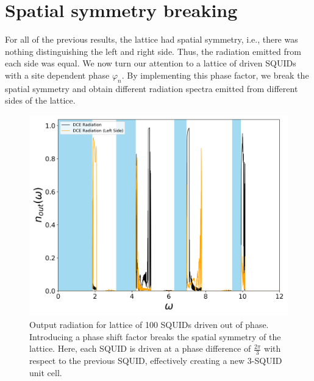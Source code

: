 \section{Spatial symmetry breaking}\label{sec:results_symmetry_breaking}

For all of the previous results, the lattice had spatial symmetry, i.e., there was nothing distinguishing the left and right side. Thus, the radiation emitted from each side was equal. We now turn our attention to a lattice of driven SQUIDs with a site dependent phase $\varphi_n$. By implementing this phase factor, we break the spatial symmetry and obtain different radiation spectra emitted from different sides of the lattice.
%
\begin{figure}[h]
    \includegraphics[width=\textwidth, keepaspectratio]{figures/results/phase_shift_2pi_3_both.png}
    \caption{Output radiation for lattice of 100 SQUIDs driven out of phase. Introducing a phase shift factor breaks the spatial symmetry of the lattice. Here, each SQUID is driven at a phase difference of $\frac{2\pi}{3}$ with respect to the previous SQUID, effectively creating a new 3-SQUID unit cell.}
    \label{fig:phase_2pi_3_both}
\end{figure}
\clearpage
%
%
